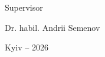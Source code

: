 \begin{titlepage}
    \vspace{1cm}

    \noindent
    \begin{minipage}[t]{0.45\textwidth}
        Supervisor
    \end{minipage}
    \begin{minipage}[t]{0.5\textwidth}
        \begin{flushright}
            Dr. habil. Andrii Semenov
        \end{flushright}
    \end{minipage}

    \vspace{1.5cm}

    \begin{center}
        Kyiv -- 2026
    \end{center}
\end{titlepage}
\restoregeometry
\cleardoublepage
